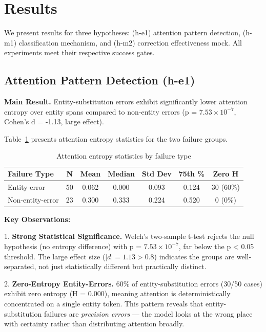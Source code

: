 \section{Results}
\label{sec:results}

We present results for three hypotheses: (h-e1) attention pattern detection, (h-m1) classification mechanism, and (h-m2) correction effectiveness mock. All experiments meet their respective success gates.

\subsection{Attention Pattern Detection (h-e1)}

\textbf{Main Result.} Entity-substitution errors exhibit significantly lower attention entropy over entity spans compared to non-entity errors (p = $7.53 \times 10^{-7}$, Cohen's d = -1.13, large effect).

Table~\ref{tab:entropy_stats} presents attention entropy statistics for the two failure groups.

\begin{table}[h]
\centering
\caption{Attention entropy statistics by failure type}
\label{tab:entropy_stats}
\begin{tabular}{lcccccc}
\toprule
Failure Type & N & Mean & Median & Std Dev & 75th \% & Zero H \\
\midrule
Entity-error & 50 & 0.062 & 0.000 & 0.093 & 0.124 & 30 (60\%) \\
Non-entity-error & 23 & 0.300 & 0.333 & 0.224 & 0.520 & 0 (0\%) \\
\bottomrule
\end{tabular}
\end{table}

\textbf{Key Observations:}

1. \textbf{Strong Statistical Significance.} Welch's two-sample t-test rejects the null hypothesis (no entropy difference) with p = $7.53 \times 10^{-7}$, far below the p < 0.05 threshold. The large effect size ($|d| = 1.13 > 0.8$) indicates the groups are well-separated, not just statistically different but practically distinct.

2. \textbf{Zero-Entropy Entity-Errors.} 60\% of entity-substitution errors (30/50 cases) exhibit zero entropy (H = 0.000), meaning attention is deterministically concentrated on a single entity token. This pattern reveals that entity-substitution failures are \textit{precision errors} --- the model looks at the wrong place with certainty rather than distributing attention broadly.

